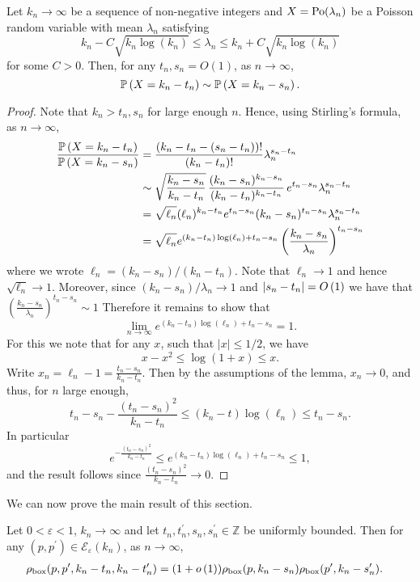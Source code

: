\begin{lemma}\label{lem:finite_shifts_poisson}
Let $k_n \to \infty$ be a sequence of non-negative integers and $X = {\mathrm{Po}}(\lambda_n)$ be a Poisson random variable with mean $\lambda_n$ satisfying
\[
		k_n - C\sqrt{k_n \log(k_n)} \le \lambda_n \le k_n + C\sqrt{k_n \log(k_n)}
\]
for some $C > 0$. Then, for any $t_n, s_n = O(1)$, as $n \to \infty$,
\[
	\mathbb{P}\left(X = k_n - t_n\right) \sim \mathbb{P}\left(X = k_n - s_n\right).
\]
\end{lemma}

\begin{proof}
Note that $k_n > t_n, s_n$ for large enough $n$. Hence, using Stirling's formula, as $n \to \infty$,
\begin{align*}
	\frac{\mathbb{P}\left(X = k_n - t_n\right)}{\mathbb{P}\left(X = k_n - s_n\right)}
	&= \frac{(k_n - t_n - (s_n-t_n))!}{(k_n - t_n)!} \lambda_n^{s_n - t_n} \\
	&\sim \sqrt{\frac{k_n - s_n}{k_n - t_n}} \, \frac{(k_n-s_n)^{k_n - s_n}}{(k_n - t_n)^{k_n - t_n}} \, e^{t_n - s_n} 
		\lambda_n^{s_n-t_n} \\
	&= \sqrt{\ell_n} (\ell_n)^{k_n - t_n} e^{t_n - s_n} (k_n - s_n)^{t_n - s_n} \lambda_n^{s_n-t_n}\\
	&= \sqrt{\ell_n} e^{(k_n - t_n)\log(\ell_n) + t_n - s_n} \left(\frac{k_n - s_n}{\lambda_n}\right)^{t_n - s_n}
\end{align*}
where we wrote $\ell_n = (k_n - s_n)/(k_n - t_n)$. Note that $\ell_n \to 1$ and hence $\sqrt{\ell_n} \to 1$. Moreover, since $(k_n - s_n)/\lambda_n \to 1$ and $|s_n - t_n| = O\left(1\right)$ we have that $\left(\frac{k_n - s_n}{\lambda_n}\right)^{t_n - s_n} \sim 1$ Therefore it remains to show that
\[
	\lim_{n \to \infty} e^{(k_n - t_n)\log(\ell_n) + t_n - s_n} = 1.
\] 
For this we note that for any $x$, such that $|x| \le 1/2$, we have 
\[
	x - x^2 \le \log(1+x) \le x.
\]
Write $x_n = \ell_n - 1 = \frac{t_n - s_n}{k_n - t_n}$. Then by the assumptions of the lemma, $x_n \to 0$, and thus, for $n$ large enough,
\[
	t_n - s_n - \frac{(t_n - s_n)^2}{k_n - t_n}
	\le (k_n-t)\log\left(\ell_n\right)
	\le t_n - s_n.
\]
In particular
\[
	e^{-\frac{(t_n-s_n)^2}{k_n-t_n}}
	\le e^{(k_n - t_n)\log(\ell_n) + t_n - s_n} \le 1,
\]
and the result follows since $\frac{(t_n-s_n)^2}{k_n-t_n} \to 0$.
\end{proof}

We can now prove the main result of this section.

\begin{lemma}\label{lem:joint_degree_factorization}
Let $0 < \varepsilon < 1$, $k_n \to \infty$ and let $t_n,t^\prime_n, s_n, s_n^\prime \in \mathbb{Z}$ be uniformly bounded.
Then for any $(p,p^\prime) \in \mathcal{E}_\varepsilon(k_n)$, as $n \to \infty$,
\begin{align*}
	\rho_{\mathrm{box}}(p,p^\prime,k_n - t_n,k_n - t_n^\prime)
	&= (1+o\left(1\right))\rho_{\mathrm{box}}(p,k_n - s_n)\rho_{\mathrm{box}}(p^\prime,k_n-s_n^\prime).
\end{align*}
\end{lemma}

